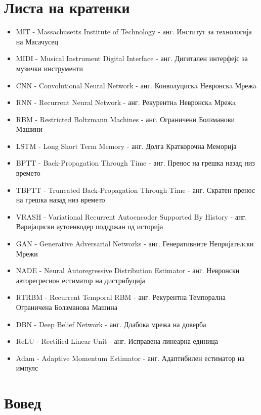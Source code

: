 \chapter*{Листа на кратенки}

\begin{itemize}
    \item MIT - Massachusetts Institute of Technology - анг. Институт за технологија на Масачусец
    \item MIDI - Musical Instrument Digital Interface - анг. Дигитален интерфејс за музички инструменти
    \item CNN - Convolutional Neural Network - анг. Конволуцискa Невронскa Мрежa
    \item RNN - Recurrent Neural Network - анг. Рекурентнa Невронскa Мрежa
    \item RBM - Restricted Boltzmann Machines - анг. Ограничени Болзманови Машини
    \item LSTM - Long Short Term Memory - анг. Долга Краткорочна Меморија
    \item BPTT - Back-Propagation Through Time - анг. Пренос на грешка назад низ времето
    \item TBPTT - Truncated Back-Propagation Through Time - анг. Скратен пренос на грешка назад низ времето
    \item VRASH - Variational Recurrent Autoencoder Supported By History - анг. Варијациски аутоенкодер поддржан од историја
    \item GAN - Generative Adversarial Networks - анг. Генеративните Непријателски Мрежи
    \item NADE - Neural Autoregressive Distribution Estimator - анг. Невронски авторегресион естиматор на дистрибуција
    \item RTRBM - Recurrent Temporal RBM - анг. Рекурентна Темпорална Ограничена Болзманова Машина
    \item DBN - Deep Belief Network - анг. Длабока мрежа на доверба
    \item ReLU - Rectified Linear Unit - анг. Исправена линеарна единица 
    \item Adam - Adaptive Momentum Estimator - анг. Адаптибилен естиматор на импулс
\end{itemize}

\newpage

\chapter{Вовед}

